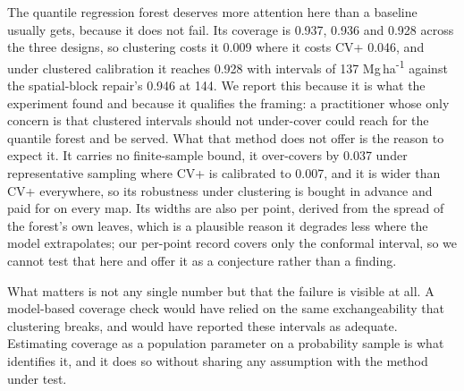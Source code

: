 \documentclass[preprint,12pt,authoryear]{elsarticle}
\newcommand{\Mgha}{Mg\,ha\textsuperscript{-1}}
\begin{document}
The quantile regression forest deserves more attention here than a baseline
usually gets, because it does not fail. Its coverage is 0.937, 0.936 and 0.928
across the three designs, so clustering costs it 0.009 where it costs CV+
0.046, and under clustered calibration it reaches 0.928 with intervals of 137
\Mgha{} against the spatial-block repair's 0.946 at 144. We report this because
it is what the experiment found and because it qualifies the framing: a
practitioner whose only concern is that clustered intervals should not
under-cover could reach for the quantile forest and be served. What that method
does not offer is the reason to expect it. It carries no finite-sample bound, it
over-covers by 0.037 under representative sampling where CV+ is calibrated to
0.007, and it is wider than CV+ everywhere, so its robustness under clustering
is bought in advance and paid for on every map. Its widths are also per point,
derived from the spread of the forest's own leaves, which is a plausible reason
it degrades less where the model extrapolates; our per-point record covers only
the conformal interval, so we cannot test that here and offer it as a
conjecture rather than a finding.

\begin{table}[!ht]
\centering
\caption{Design-based interval coverage at a nominal 0.90 level and mean width in
\Mgha{}. PICP and MPIW are means over 30 repetitions, with leading zeros dropped on
the bounded columns; SD is the standard
deviation of PICP across them and the interval is a 95 per cent confidence
interval for that mean, from the Monte Carlo standard error. The last column
counts repetitions whose own coverage fell below nominal. OOF is out of fold
and RF is random forest. The rows are not all the same construction, and the comparison is
empirical rather than like-for-like. CV+ is the deployed interval and the only
row carrying a finite-sample bound. The pooled out-of-fold quantile centres a
single half-width on the full-sample refit and is reported because it is what a
natural reading of cross-fitted residuals produces, not because it is valid. The
covariate-shift and spatial-block rows modify that pooled calibration, by
reweighting and by rescoring on held-out blocks respectively.}
\label{tab:coverage}
\footnotesize
\setlength{\tabcolsep}{2pt}

\end{table}

What matters is not any single number but that the failure is visible at all. A
model-based coverage check would have relied on the same exchangeability that
clustering breaks, and would have reported these intervals as adequate.
Estimating coverage as a population parameter on a probability sample is what
identifies it, and it does so without sharing any assumption with the method
under test.
\end{document}

